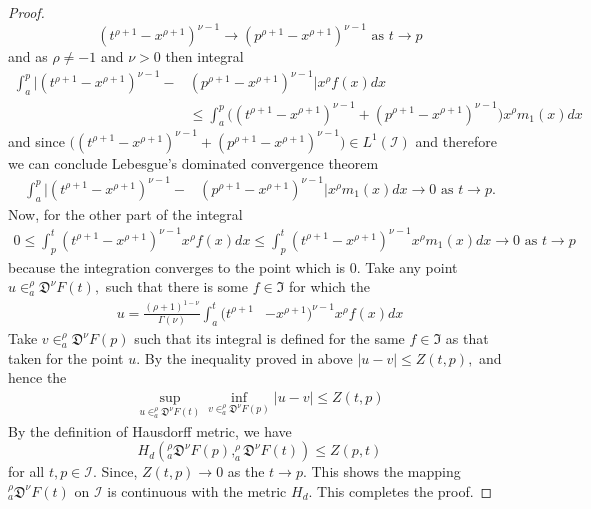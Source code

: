 \documentclass{amsproc}
\theoremstyle{definition}
\theoremstyle{remark}
\numberwithin{equation}{section}
\begin{document}
\begin{proof}
\[(t^{\rho+1}-x^{\rho+1})^{\nu-1} \to (p^{\rho+1}-x^{\rho+1})^{\nu-1} \text{ as } t  \to p \]
and as $ \rho \neq -1 $ and $ \nu > 0$ then integral 
\begin{equation*}
    \begin{aligned}
 \int_a^p\big|(t^{\rho+1}-x^{\rho+1})^{\nu-1}-&(p^{\rho+1}-x^{\rho+1})^{\nu-1}\big|x^{\rho}f(x)dx \\ & \le \int_a^p\big((t^{\rho+1}-x^{\rho+1})^{\nu-1}+(p^{\rho+1}-x^{\rho+1})^{\nu-1}\big)x^{\rho } m_1(x)dx  
  \end{aligned}
\end{equation*}
and since $ \big((t^{\rho+1}-x^{\rho+1})^{\nu-1}+(p^{\rho+1}-x^{\rho+1})^{\nu-1}\big) \in L^1(\mathcal{I})$ and therefore we can conclude Lebesgue's dominated convergence theorem 
\begin{equation*}
    \begin{aligned}
 \int_a^p\big|(t^{\rho+1}-x^{\rho+1})^{\nu-1}-&(p^{\rho+1}-x^{\rho+1})^{\nu-1}\big|x^{\rho}m_1(x)dx \to 0 \text{ as } t\to p.
  \end{aligned}
\end{equation*}
Now, for the other part of the integral 
\begin{equation*}
    \begin{aligned}
       0\le \int_p^t(t^{\rho+1}-x^{\rho+1})^{\nu-1}x^{\rho}f(x)dx \le  \int_p^t(t^{\rho+1}-x^{\rho+1})^{\nu-1}x^{\rho}m_1(x) dx \to 0 \text{ as } t\to p 
    \end{aligned}
\end{equation*}
because the integration converges to the point which is $0.$ Take any point $u\in _a^\rho\mathfrak{D}^\nu F(t),$ such that there is some $f \in \mathfrak{I}$ for which the 
\begin{equation*}
    \begin{aligned}
u= \frac{(\rho+1)^{1-\nu}}{\Gamma(\nu)}\int_a^t(t^{\rho+1}&-x^{\rho+1})^{\nu-1}x^{\rho}f(x)dx
 \end{aligned}
\end{equation*}
Take $v\in _a^\rho\mathfrak{D}^\nu F(p)$ such that its integral is defined for the same $f\in \mathfrak{I}$ as that taken for the point $u.$ By the inequality proved in above $ |u-v| \le Z(t,p),$ and hence the 
      \begin{equation*}
          \begin{aligned}
              \sup_{u\in  _a^\rho\mathfrak{D}^\nu F(t)} \inf_{v\in _a^\rho\mathfrak{D}^\nu F(p)}|u-v| \le Z(t,p)
          \end{aligned}
      \end{equation*}
By the definition of Hausdorff metric, we have 
\[ H_d(_a^\rho\mathfrak{D}^\nu F(p),_a^\rho\mathfrak{D}^\nu F(t)) \le Z(p,t) \] for all $t,p \in \mathcal{I}.$ Since, $Z(t,p)\to 0$ as the $t\to p.$ This shows the mapping $ _a^\rho\mathfrak{D}^\nu F(t)$ on $\mathcal{I}$ is continuous with the metric $H_d.$ This completes the proof. 
\end{proof}
\end{document}
